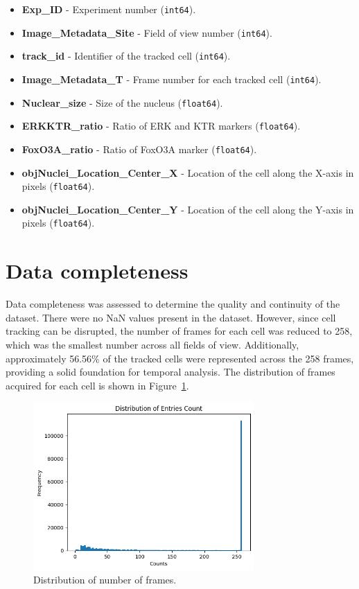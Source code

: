 \documentclass[licencjacka,en]{pracamgr}
\begin{document}
\begin{itemize}
    \item \textbf{Exp\_ID} - Experiment number (\texttt{int64}).
    \item \textbf{Image\_Metadata\_Site} - Field of view number (\texttt{int64}).
    \item \textbf{track\_id} - Identifier of the tracked cell (\texttt{int64}).
    \item \textbf{Image\_Metadata\_T} - Frame number for each tracked cell (\texttt{int64}).
    \item \textbf{Nuclear\_size} - Size of the nucleus (\texttt{float64}).
    \item \textbf{ERKKTR\_ratio} - Ratio of ERK and KTR markers (\texttt{float64}).
    \item \textbf{FoxO3A\_ratio} - Ratio of FoxO3A marker (\texttt{float64}).
    \item \textbf{objNuclei\_Location\_Center\_X} - Location of the cell along the X-axis in pixels (\texttt{float64}).
    \item \textbf{objNuclei\_Location\_Center\_Y} - Location of the cell along the Y-axis in pixels (\texttt{float64}).
\end{itemize}




\section{Data completeness}

Data completeness was assessed to determine the quality and continuity of the dataset. There were no NaN values present in the dataset. However, since cell tracking can be disrupted, the number of frames for each cell was reduced to 258, which was the smallest number across all fields of view. Additionally, approximately 56.56\% of the tracked cells were represented across the 258 frames, providing a solid foundation for temporal analysis. The distribution of frames acquired for each cell is shown in Figure~\ref{fig:frames_distribution}.

\begin{figure}[ht]
    \centering
    \includegraphics[width=0.75\textwidth]{images/frames_distribution.png}
    \caption{Distribution of number of frames.}
    \label{fig:frames_distribution}
\end{figure} 
\end{document}
